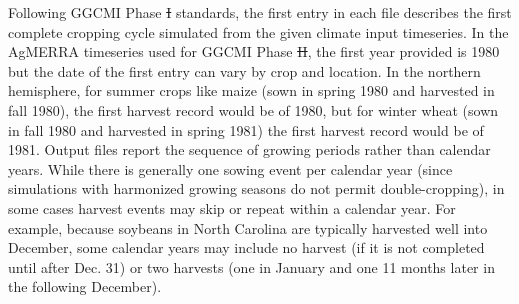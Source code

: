 \documentclass[gmd, manuscript]{copernicus} %
\providecommand{\DIFadd}[1]{{\protect\color{blue}\uwave{#1}}} %
\providecommand{\DIFdel}[1]{{\protect\color{red}\sout{#1}}}                      %
\providecommand{\DIFaddbegin}{} %
\providecommand{\DIFaddend}{} %
\providecommand{\DIFdelbegin}{} %
\providecommand{\DIFdelend}{} %
\begin{document}
Following GGCMI Phase \DIFdelbegin \DIFdel{I }\DIFdelend \DIFaddbegin \DIFadd{1 }\DIFaddend standards, the first entry in each file describes the first complete cropping cycle simulated from the given climate input timeseries. 
In the AgMERRA timeseries used for GGCMI Phase \DIFdelbegin \DIFdel{II}\DIFdelend \DIFaddbegin \DIFadd{2}\DIFaddend , the first year provided is 1980 but the date of the first entry can vary by crop and location. 
In the northern hemisphere, for summer crops like maize (sown in spring 1980 and harvested in fall 1980), the first harvest record would be of 1980, but for winter wheat (sown in fall 1980 and harvested in spring 1981) the first harvest record would be of 1981. Output files report the sequence of growing periods rather than calendar years. 
While there is generally one sowing event per calendar year (since simulations with harmonized growing seasons do not permit double-cropping), in some cases harvest events may skip or repeat within a calendar year.
For example, because soybeans in North Carolina are typically harvested well into December, some calendar years may include no harvest (if it is not completed until after Dec. 31) or two harvests (one in January and one 11 months later in the following December). 
\end{document}
